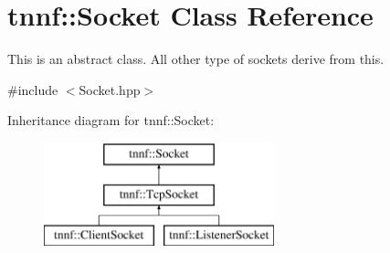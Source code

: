 \hypertarget{classtnnf_1_1_socket}{}\section{tnnf\+:\+:Socket Class Reference}
\label{classtnnf_1_1_socket}


This is an abstract class. All other type of sockets derive from this.  




{\ttfamily \#include $<$Socket.\+hpp$>$}

Inheritance diagram for tnnf\+:\+:Socket\+:\begin{figure}[H]
\begin{center}
\leavevmode
\includegraphics[height=3.000000cm]{classtnnf_1_1_socket}
\end{center}
\end{figure}
